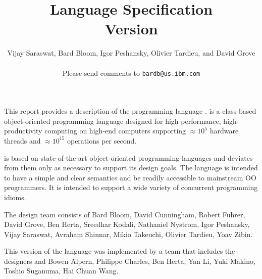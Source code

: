 
\thispagestyle{empty}


\title{ \Xten Language Specification \\
\large Version \integerversion}
\author{Vijay Saraswat, Bard Bloom, Igor Peshansky, Olivier Tardieu, and David Grove\\
\\
Please send comments to 
\texttt{bardb@us.ibm.com}}

\maketitle

\newcommand\authorsc[1]{#1}

This report provides a description of the programming
language \Xten. \Xten{} is a class-based object-oriented
programming language designed for high-performance, high-productivity
computing on high-end computers supporting $\approx 10^5$ hardware threads
and $\approx 10^{15}$ operations per second. 

\Xten{} is based on state-of-the-art object-oriented programming
languages and deviates from them only as necessary to support its
design goals. The language is intended to have a simple and clear
semantics and be readily accessible to mainstream OO programmers. It
is intended to support a wide variety of concurrent programming
idioms.


The \Xten{} design team consists of
\authorsc{Bard Bloom}, 
\authorsc{David Cunningham},
\authorsc{Robert Fuhrer},
\authorsc{David Grove},
\authorsc{Ben Herta},
\authorsc{Sreedhar Kodali}, 
\authorsc{Nathaniel Nystrom},
\authorsc{Igor Peshansky}, 
\authorsc{Vijay Saraswat},
\authorsc{Avraham Shinnar},
\authorsc{Mikio Takeuchi},
\authorsc{Olivier Tardieu},
\authorsc{Yoav Zibin}.

This version of the language was implemented by a team that includes
the designers and 
\authorsc{Bowen Alpern}, 
\authorsc{Philippe Charles}, 
\authorsc{Ben Herta}, 
\authorsc{Yan Li}, 
\authorsc{Yuki Makino}, 
\authorsc{Toshio Suganuma}, 
\authorsc{Hai Chuan Wang}. 


